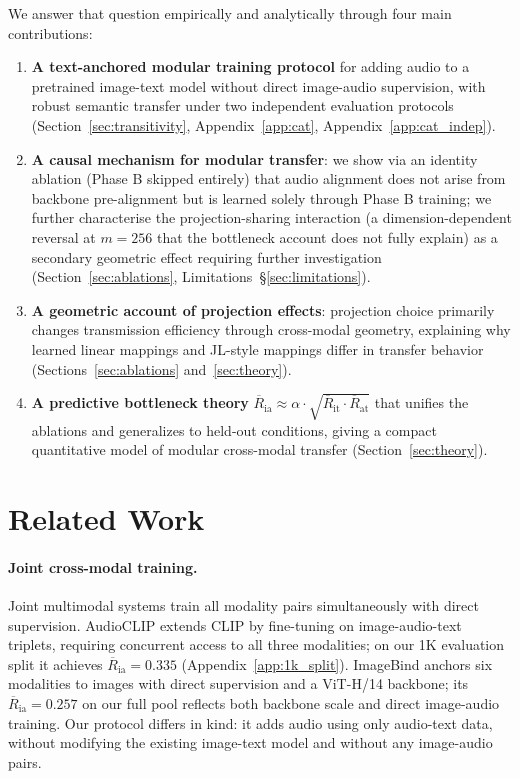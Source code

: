 \documentclass{article}
\newcommand{\avgR}{\overline{R}}
\begin{document}
We answer that question empirically and analytically through four main contributions:
\begin{enumerate}
  \item \textbf{A text-anchored modular training protocol} for adding audio to a pretrained image-text model without direct image-audio supervision, with robust semantic transfer under two independent evaluation protocols (Section~\ref{sec:transitivity}, Appendix~\ref{app:cat}, Appendix~\ref{app:cat_indep}).
  \item \textbf{A causal mechanism for modular transfer}: we show via an identity ablation (Phase B skipped entirely) that audio alignment does not arise from backbone pre-alignment but is learned solely through Phase B training; we further characterise the projection-sharing interaction (a dimension-dependent reversal at $m=256$ that the bottleneck account does not fully explain) as a secondary geometric effect requiring further investigation (Section~\ref{sec:ablations}, Limitations~\S\ref{sec:limitations}).
  \item \textbf{A geometric account of projection effects}: projection choice primarily changes transmission efficiency through cross-modal geometry, explaining why learned linear mappings and JL-style mappings differ in transfer behavior (Sections~\ref{sec:ablations} and~\ref{sec:theory}).
  \item \textbf{A predictive bottleneck theory} $\avgR_\mathrm{ia} \approx \alpha \cdot \sqrt{\avgR_\mathrm{it} \cdot \avgR_\mathrm{at}}$ that unifies the ablations and generalizes to held-out conditions, giving a compact quantitative model of modular cross-modal transfer (Section~\ref{sec:theory}).
\end{enumerate}


\section{Related Work}

\paragraph{Joint cross-modal training.}
Joint multimodal systems train all modality pairs simultaneously with direct supervision.
AudioCLIP \citep{guzhov2022audioclip} extends CLIP by fine-tuning on image-audio-text triplets, requiring concurrent access to all three modalities; on our 1K evaluation split it achieves $\avgR_\mathrm{ia}=0.335$ (Appendix~\ref{app:1k_split}).
ImageBind \citep{girdhar2023imagebind} anchors six modalities to images with direct supervision and a ViT-H/14 backbone; its $\avgR_\mathrm{ia}=0.257$ on our full pool reflects both backbone scale and direct image-audio training.
Our protocol differs in kind: it adds audio using only audio-text data, without modifying the existing image-text model and without any image-audio pairs.
\end{document}
